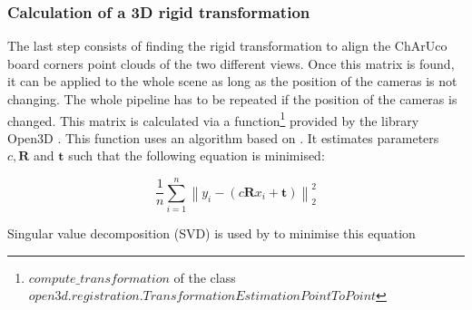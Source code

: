 \subsubsection{Calculation of a 3D  rigid transformation}
\label{section:3d_rigid_transformation}

The last step consists of finding the rigid transformation to align the ChArUco board corners point clouds of the two different views. Once this matrix is found, it can be applied to the whole scene as long as the position of the cameras is not changing. The whole pipeline has to be repeated if the position of the cameras is changed. This matrix is calculated via a function\footnote{$compute\_transformation$ of the class $open3d.registration.TransformationEstimationPointToPoint$}
 provided by the library Open3D \cite{Zhou2018}. This function uses an algorithm based on \cite{umeyama_least-squares_1991}. It estimates parameters $c, \mathbf{R}$ and $\mathbf{t}$ such that the following equation is minimised:
 
 
 \begin{equation}
    \frac{1}{n} \sum_{i=1}^{n}\left\|y_{i}-\left(c \mathbf{R} x_{i}+\mathbf{t}\right)\right\|_{2}^{2}
\end{equation}

Singular value decomposition (SVD) is used by \cite{umeyama_least-squares_1991} to minimise this equation
 



